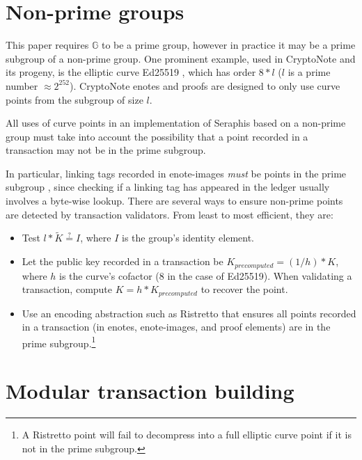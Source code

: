 \section{Non-prime groups}
\label{sec:non-prime-groups}

This paper requires $\mathbb{G}$ to be a prime group, however in practice it may be a prime subgroup of a non-prime group. One prominent example, used in CryptoNote \cite{cryptoNoteWhitePaper} and its progeny, is the elliptic curve Ed25519 \cite{Bernstein2012-high-speed-high-security-ed25519}, which has order $8*l$ ($l$ is a prime number $\approx 2^{252}$). CryptoNote enotes and proofs are designed to only use curve points from the subgroup of size $l$.

All uses of curve points in an implementation of Seraphis based on a non-prime group must take into account the possibility that a point recorded in a transaction may not be in the prime subgroup.

In particular, linking tags recorded in enote-images {\em must} be points in the prime subgroup \cite{key-image-bug}, since checking if a linking tag has appeared in the ledger usually involves a byte-wise lookup. There are several ways to ensure non-prime points are detected by transaction validators. From least to most efficient, they are:

\begin{itemize}
    \item Test $l*\tilde{K} \stackrel{?}{=} I$, where $I$ is the group's identity element.

    \item Let the public key recorded in a transaction be $K_{precomputed} = (1/h)*K$, where $h$ is the curve's cofactor (8 in the case of Ed25519). When validating a transaction, compute $K = h*K_{precomputed}$ to recover the point.

    \item Use an encoding abstraction such as Ristretto \cite{ristretto} that ensures all points recorded in a transaction (in enotes, enote-images, and proof elements) are in the prime subgroup.\footnote{A Ristretto point will fail to decompress into a full elliptic curve point if it is not in the prime subgroup.}
\end{itemize}



\section{Modular transaction building}
\label{sec:modular-tx-building}

